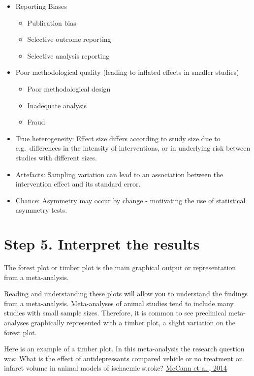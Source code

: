 \documentclass[
]{book}
\providecommand{\tightlist}{%
  \setlength{\itemsep}{0pt}\setlength{\parskip}{0pt}}
\begin{document}
\begin{itemize}
\item
  Reporting Biases

  \begin{itemize}
  \tightlist
  \item
    Publication bias
  \item
    Selective outcome reporting
  \item
    Selective analysis reporting
  \end{itemize}
\item
  Poor methodological quality (leading to inflated effects in smaller studies)

  \begin{itemize}
  \tightlist
  \item
    Poor methodological design
  \item
    Inadequate analysis
  \item
    Fraud
  \end{itemize}
\item
  True heterogeneity: Effect size differs according to study size due to e.g.~differences in the intensity of interventions, or in underlying risk between studies with different sizes.
\item
  Artefacts: Sampling variation can lead to an association between the intervention effect and its standard error.
\item
  Chance: Asymmetry may occur by change - motivating the use of statistical asymmetry tests.
\end{itemize}

\hypertarget{step-5.-interpret-the-results}{%
\section{Step 5. Interpret the results}\label{step-5.-interpret-the-results}}

The forest plot or timber plot is the main graphical output or representation from a meta-analysis.

Reading and understanding these plots will allow you to understand the findings from a meta-analysis. Meta-analyses of animal studies tend to include many studies with small sample sizes. Therefore, it is common to see preclinical meta-analyses graphically represented with a timber plot, a slight variation on the forest plot.

Here is an example of a timber plot. In this meta-analysis the research question was: What is the effect of antidepressants compared vehicle or no treatment on infarct volume in animal models of ischaemic stroke? \href{https://doi.org/10.1161/STROKEAHA.114.006304}{McCann et al., 2014}
\end{document}
